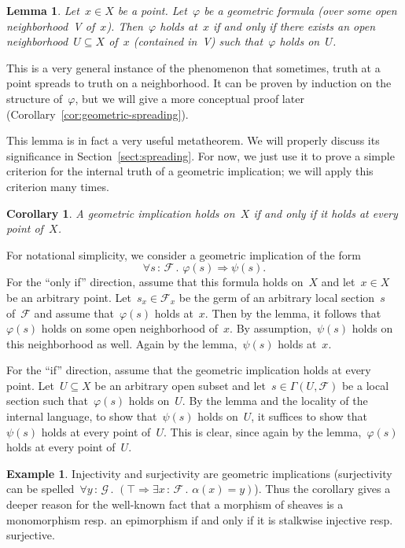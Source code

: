 \documentclass[10pt,reqno,a4paper]{amsbook}
\makeatletter
\theoremstyle{definition}
\newtheorem{ex}[defn]{Example}
\theoremstyle{plain}
\newtheorem{cor}[defn]{Corollary}
\newtheorem{lemma}[defn]{Lemma}
\theoremstyle{remark}
\newcommand{\F}{\mathcal{F}}
\renewcommand{\G}{\mathcal{G}}
\newcommand{\?}{\,{:}\,}
\renewcommand{\_}{\mathpunct{.}\,}
\newcommand{\resp}{resp.\@\xspace}
\renewenvironment{proof}[1][\proofname]{\par
  \pushQED{\qed}%
  \normalfont \topsep6\p@\@plus6\p@\relax
  \trivlist
  \item[\hskip\labelsep
        \itshape
    #1\@addpunct{.}]\ignorespaces
}{%
  \popQED\endtrivlist\@endpefalse
}
\makeatother
\begin{document}
\begin{lemma}\label{lemma:geometric-stalk-neighbourhood}
Let~$x \in X$ be a point. Let~$\varphi$ be a geometric formula (over some open
neighborhood~V of~$x$).
Then~$\varphi$ holds at~$x$ if and only if there exists an open neighborhood~$U
\subseteq X$ of~$x$ (contained in~V) such that~$\varphi$ holds on~$U$.
\end{lemma}
\begin{proof}This is a very general instance of the phenomenon that sometimes,
truth at a point spreads to truth on a neighborhood. It can be proven by
induction on the structure of~$\varphi$, but we will give a more conceptual
proof later (Corollary~\ref{cor:geometric-spreading}).
\end{proof}

This lemma is in fact a very useful metatheorem. We will properly discuss its
significance in Section~\ref{sect:spreading}. For now, we just use it to prove a
simple criterion for the internal truth of a geometric implication; we will
apply this criterion many times.

\begin{cor}\label{cor:geometric-implication}
A geometric implication holds on~$X$ if and only if it holds at
every point of~$X$.\end{cor}
\begin{proof}For notational simplicity, we consider a geometric implication of
the form
\[ \forall s\?\F\_ \varphi(s) \Rightarrow \psi(s). \]
For the ``only if'' direction, assume that this formula holds on~$X$ and let~$x
\in X$ be an arbitrary point. Let~$s_x \in \F_x$ be the germ of an arbitrary
local section~$s$ of~$\F$ and assume that~$\varphi(s)$ holds at~$x$. Then by
the lemma, it follows that~$\varphi(s)$ holds on some open neighborhood of~$x$. By
assumption,~$\psi(s)$ holds on this neighborhood as well. Again by the
lemma,~$\psi(s)$ holds at~$x$.

For the ``if'' direction, assume that the geometric implication holds at every
point. Let~$U \subseteq X$ be an arbitrary open subset and let~$s \in
\Gamma(U,\F)$ be a local section such that~$\varphi(s)$ holds on~$U$. By the
lemma and the locality of the internal language, to show that~$\psi(s)$ holds
on~$U$, it suffices to show that~$\psi(s)$
holds at every point of~$U$. This is clear, since again by the
lemma,~$\varphi(s)$ holds at every point of~$U$.
\end{proof}

\begin{ex}Injectivity and surjectivity are geometric implications (surjectivity
can be spelled~$\forall y\?\G\_ (\top \Rightarrow \exists x\?\F\_ \alpha(x) =
y)$). Thus the corollary gives a deeper reason for the well-known fact that a
morphism of sheaves is a monomorphism \resp an epimorphism if and only if it is
stalkwise injective \resp surjective.\end{ex}
\end{document}
